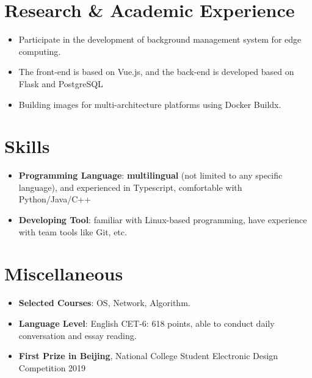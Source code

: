 \documentclass{resume}
\newcommand{\en}[1]{#1}
\newcommand{\zh}[1]{}
\begin{document}
\section{\en{Research \& Academic Experience}\zh{研究经历}}
\en{}
\zh{\datedsubsection{\textbf{中国科学院自动化研究所}}{2019/04 -- 2020/06}}
\en{}
\zh{\role{复杂系统管理与控制国家重点实验室}{科研实习}}
\begin{itemize}
  \item \en{Participate in the development of background management system for edge computing.}
        \zh{参与构建面向边缘计算的后台管理系统开发}
  \item \en{The front-end is based on Vue.js, and the back-end is developed based on Flask and PostgreSQL}
        \zh{前端基于 Vue.js 进行开发，后端基于 Flask 和 PostgreSQL 进行开发}
  \item \en{Building images for multi-architecture platforms using Docker Buildx.}
        \zh{使用 Docker Buildx 构建多系统架构支持的 Docker 镜像并部署}
\end{itemize}

\section{\en{Skills}\zh{技能}}
\begin{itemize}[parsep=0.25ex]
  \item \en{\textbf{Programming Language}: \textbf{multilingual} (not limited to any specific language), and experienced in Typescript, comfortable with Python/Java/C++}
        \zh{\textbf{编程语言}: \textbf{泛语言}（编程不受特定语言限制），熟悉 Typescript，了解 Python/Java/C++ 等}
  \item \en{\textbf{Developing Tool}: familiar with Linux-based programming, have experience with team tools like Git, etc.}
        \zh{\textbf{开发工具}: 熟悉 Linux，有 Git 等团队协作工具的使用经验}
\end{itemize}

\section{\en{Miscellaneous}\zh{杂项}}
\begin{itemize}[parsep=0.25ex]
  \item \en{\textbf{Selected Courses}: OS, Network, Algorithm.}
        \zh{\textbf{主修课程}: 操作系统、计算机网络、算法设计与分析}
  \item \en{\textbf{Language Level}: English CET-6: 618 points, able to conduct daily conversation and essay reading.}
        \zh{\textbf{语言水平}: 英语 CET-6: 618 分，能够进行日常对话和论文阅读}
  \item \en{\textbf{First Prize in Beijing}, National College Student Electronic Design Competition 2019}
        \zh{\textbf{北京市一等奖}, 2019 年全国大学生电子设计竞赛}
\end{itemize}
\end{document}
